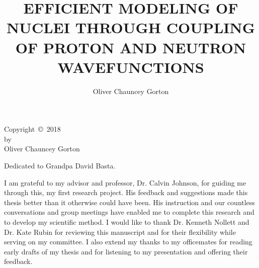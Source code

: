 \documentclass{sdsu-thesis-chap}
\author{Oliver Chauncey Gorton}
\title{EFFICIENT MODELING OF NUCLEI THROUGH COUPLING \\ OF PROTON AND NEUTRON WAVEFUNCTIONS} %
\begin{document}
\maketitle

\makesignature

\begin{copyrightpage}
  Copyright~\copyright~2018\\
  by \\
  Oliver Chauncey Gorton
\end{copyrightpage}

% 
\begin{dedication}
  \vspace{3in}
  \centering
  Dedicated to Grandpa David Basta. 
\end{dedication}


\begin{abstract}
  
\end{abstract}

\tableofcontents

\listoftables

\listoffigures

\begin{acknowledgments}
I am grateful to my advisor and professor, Dr. Calvin Johnson, for guiding me
through this, my first research project. His feedback and suggestions made
this thesis better than it otherwise could have been. His instruction and our countless
conversations and group meetings have enabled me to complete this research
and to develop my scientific method. I would like to thank Dr. Kenneth Nollett and Dr. Kate Rubin 
for reviewing this manuscript and for their flexibility while serving on my committee.
I also extend my thanks to my officemates for reading early drafts 
of my thesis and for listening to my presentation
and offering their feedback. 
\end{acknowledgments}
\end{document}
